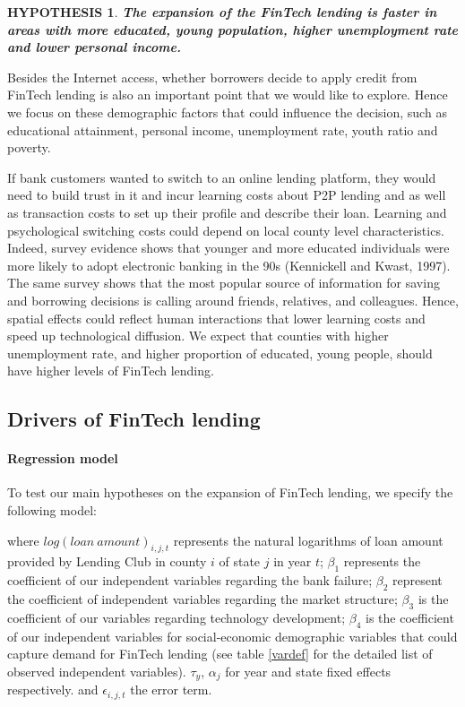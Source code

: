 \documentclass[11pt, a4paper, leqno]{article}
\newtheorem{hypothesis}{HYPOTHESIS}
\begin{document}
\begin{hypothesis}
\textbf{The expansion of the FinTech lending is faster in areas with more educated, young population, higher unemployment rate and lower personal income.}
\end{hypothesis}
Besides the Internet access, whether borrowers decide to apply credit from FinTech lending is also an important point that we would like to explore. Hence we focus on these demographic factors that could influence the decision, such as educational attainment, personal income, unemployment rate, youth ratio and poverty.

If bank customers wanted to switch to an online lending platform, they would need to build trust in it and incur learning costs about P2P lending and as well as transaction costs to set up their profile and describe their loan. Learning and psychological switching costs could depend on local county level characteristics. Indeed, survey evidence shows that younger and more educated individuals were more likely to adopt electronic banking in the 90s (Kennickell and Kwast, 1997). The same survey shows that the most popular source of information for saving and borrowing decisions is calling around friends, relatives, and colleagues. Hence, spatial effects could reflect human interactions that lower learning costs and speed up technological diffusion. We expect that counties with higher unemployment rate, and higher proportion of educated, young people, should have higher levels of FinTech lending.

\subsection{Drivers of FinTech lending}

\paragraph{Regression model} 
To test our main hypotheses on the expansion of FinTech lending, we specify the following model:

where $log(loan\ amount)_{i,j,t}$ represents the natural logarithms of loan amount provided by Lending Club in county $i$ of state $j$ in year $t$; $\beta_1$ represents the coefficient of our independent variables regarding the bank failure; $\beta_2$ represent the coefficient of independent variables regarding the market structure; $\beta_3$ is the coefficient of our variables regarding technology development; $\beta_4$ is the coefficient of our independent variables for social-economic demographic variables that could capture demand for FinTech lending (see table \ref{vardef} for the detailed list of observed independent variables). $\tau_{y}$, $\alpha_{j}$ for year and state fixed effects respectively. and $\epsilon_{i,j,t}$ the error term. 
\end{document}
